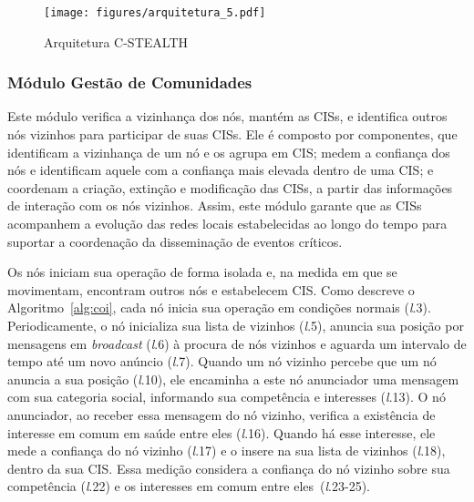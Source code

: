 \documentclass[12pt]{article}
\begin{document}
\begin{figure}[H]
\hspace{-0.5cm}
\texttt{[image: figures/arquitetura\_5.pdf]}
\vspace{-0.5cm}
\caption{Arquitetura C-STEALTH}
\label{fig:ArquiteturaStealth}
\end{figure}

\vspace{-1.0cm}

\subsubsection{Módulo Gestão de Comunidades}

Este módulo %
verifica a vizinhança dos %
nós, mantém as CISs, e %
identifica %
outros nós vizinhos para participar de suas CISs. Ele é composto por %
componentes, que identificam a vizinhança de um nó e os agrupa em
CIS;
medem a confiança dos nós e identificam aquele com a confiança mais elevada dentro de uma CIS; e coordenam a criação, extinção e modificação das CISs, a partir das informações de interação com os nós vizinhos. Assim, este módulo garante que as CISs acompanhem a evolução das redes locais estabelecidas ao longo do tempo para suportar a coordenação da disseminação de eventos críticos.

Os nós %
iniciam sua operação de forma isolada e, na medida em que se movimentam, encontram outros nós e estabelecem
CIS. Como descreve o Algoritmo~\ref{alg:coi}, cada nó inicia sua operação em condições normais (\textit{l}.3). Periodicamente, o nó inicializa sua lista de vizinhos (\textit{l}.5), anuncia sua posição por mensagens em \textit{broadcast} (\textit{l}.6) à procura de nós vizinhos e aguarda um intervalo de tempo até um novo anúncio (\textit{l}.7). Quando um nó vizinho percebe que um nó anuncia a sua posição (\textit{l}.10), ele encaminha a este nó anunciador uma mensagem com sua categoria social, informando sua competência e interesses (\textit{l}.13). O nó anunciador, ao receber essa mensagem do nó vizinho, verifica a existência de interesse em comum em saúde entre eles (\textit{l}.16). Quando há esse interesse,
ele mede a confiança do nó vizinho (\textit{l}.17) e o insere na sua lista de vizinhos (\textit{l}.18), dentro da sua
CIS. Essa medição considera a confiança do nó vizinho sobre sua competência (\textit{l}.22) e os interesses em comum entre eles~(\textit{l}.23-25). 
\end{document}
